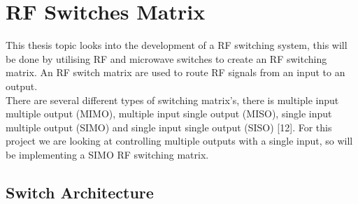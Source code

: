 \documentclass[12pt,openany,a4paper]{book}
\begin{document}
\section{RF Switches Matrix}
This thesis topic looks into the development of a RF switching system, this will be done by utilising RF and microwave switches to create an RF switching matrix. An RF switch matrix are used to route RF signals from an input to an output.\\
There are several different types of switching matrix's, there is multiple input multiple output (MIMO), multiple input single output (MISO), single input multiple output (SIMO) and single input single output (SISO) [12]. For this project we are looking at controlling multiple outputs with a single input, so will be implementing a SIMO RF switching matrix.


\subsection{Switch Architecture}
\end{document}
